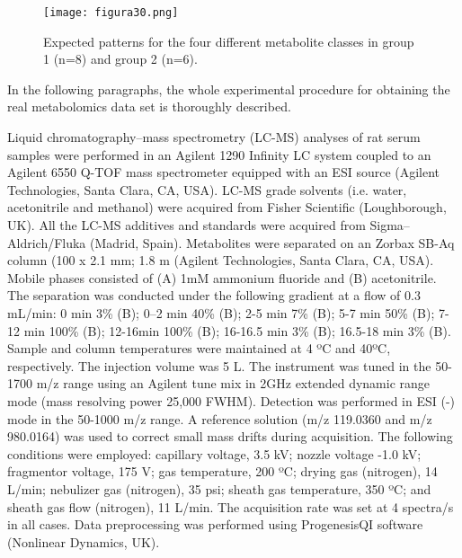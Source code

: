 \begin{figure}[hbtp]
	\centering
\texttt{[image: figura30.png]}
\caption[Expected patterns for the four different metabolite classes in the real metabolomics data set]{Expected patterns for the four different metabolite classes in group 1 (n=8) and group 2 (n=6).}
\label{figura30}
\end{figure}

In the following paragraphs, the whole experimental procedure for obtaining the real metabolomics data set is thoroughly described. 

Liquid chromatography–mass spectrometry (LC-MS) analyses of rat serum samples were performed in an Agilent 1290 Infinity LC system coupled to an Agilent 6550 Q-TOF mass spectrometer equipped with an ESI source (Agilent Technologies, Santa Clara, CA, USA). LC-MS grade solvents (i.e. water, acetonitrile and methanol) were acquired from Fisher Scientific (Loughborough, UK). All the LC-MS additives and standards were acquired from Sigma–Aldrich/Fluka (Madrid, Spain). Metabolites were separated on an Zorbax SB-Aq column (100 x 2.1 mm; 1.8 {\textmu}m (Agilent Technologies, Santa Clara, CA, USA). Mobile phases consisted of (A) 1mM ammonium fluoride and (B) acetonitrile. The separation was conducted under the following gradient at a flow of 0.3 mL/min: 0 min 3\% (B); 0–2 min 40\% (B); 2-5 min 7\% (B); 5-7 min 50\% (B); 7-12 min 100\% (B); 12-16min 100\% (B); 16-16.5 min 3\% (B); 16.5-18 min 3\% (B). Sample and column temperatures were maintained at 4 ºC and 40ºC, respectively. The injection volume was 5 {\textmu}L. 
The instrument was tuned in the 50-1700 m/z range using an Agilent tune mix in 2GHz extended dynamic range mode (mass resolving power 25,000 FWHM). Detection was performed in ESI (-) mode in the 50-1000 m/z range. A reference solution (m/z 119.0360 and m/z 980.0164) was used to correct small mass drifts during acquisition. The following conditions were employed: capillary voltage, 3.5 kV; nozzle voltage -1.0 kV; fragmentor voltage, 175 V; gas temperature, 200 ºC; drying gas (nitrogen), 14 L/min; nebulizer gas (nitrogen), 35 psi; sheath gas temperature, 350 ºC; and sheath gas flow (nitrogen), 11 L/min. The acquisition rate was set at 4 spectra/s in all cases. Data preprocessing was performed using ProgenesisQI software (Nonlinear Dynamics, UK).

